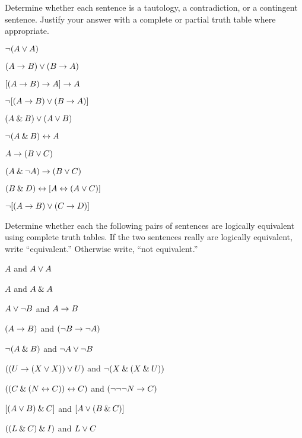 \noindent\problempart
\label{pr.TT.TTorC4}
Determine whether each sentence is a tautology, a contradiction, or a contingent sentence. Justify your answer with a complete or partial truth table where appropriate.
\begin{earg}
\item  $\neg (A \vee A)$\vspace{.5ex}							%
\item $(A \rightarrow B) \vee (B \rightarrow A)$\vspace{.5ex}					%
\item $[(A \rightarrow B) \rightarrow A] \rightarrow A$\vspace{.5ex}					%
\item $\neg[( A \rightarrow B) \vee (B \rightarrow A)]$\vspace{.5ex}			%
\item $(A \mathbin{\&} B) \vee (A \vee B)$\vspace{.5ex} 				%
\item $\neg(A\mathbin{\&} B) \leftrightarrow A$\vspace{.5ex} 					%
\item $A\rightarrow(B\vee C)$\vspace{.5ex} 							%
\item $(A \mathbin{\&}\neg A) \rightarrow (B \vee C)$\vspace{.5ex} 			%
\item $(B\mathbin{\&} D) \leftrightarrow [A \leftrightarrow(A \vee C)]$\vspace{.5ex}			%
\item $\neg[(A \rightarrow B) \vee (C \rightarrow D)]$\vspace{.5ex} 			%
\end{earg}



\noindent\problempart
Determine whether each the following pairs of sentences are logically equivalent using complete truth tables. If the two sentences really are logically equivalent, write ``equivalent.'' Otherwise write, ``not equivalent.''
\begin{earg}
\item $A$ and $A \vee A$
\item $A$ and $A \mathbin{\&} A$
\item $A \vee \neg B$ and $A\rightarrow B$
\item $(A \rightarrow B)$ and $(\neg B \rightarrow \neg A)$
\item $\neg(A \mathbin{\&} B)$ and $\neg A \vee \neg B$
\item $ ((U \rightarrow (X \vee X)) \vee U)$ and $\neg (X \mathbin{\&} (X \mathbin{\&} U))$
\item $ ((C \mathbin{\&} (N \leftrightarrow C)) \leftrightarrow C)$ and $(\neg \neg \neg N \rightarrow C)$
\item $[(A \vee B) \mathbin{\&} C]$ and $[A \vee (B \mathbin{\&} C)]$
\item $((L \mathbin{\&} C) \mathbin{\&} I)$ and $L \vee C$
\end{earg}


